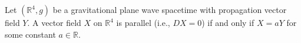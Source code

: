 Let $(\mathbb{R}^4, g)$ be a gravitational plane wave spacetime with propagation vector field $Y$. A vector field $X$ on $\mathbb{R}^4$ is parallel (i.e., $DX = 0$) if and only if $X = aY$ for some constant $a \in \mathbb{R}$.
